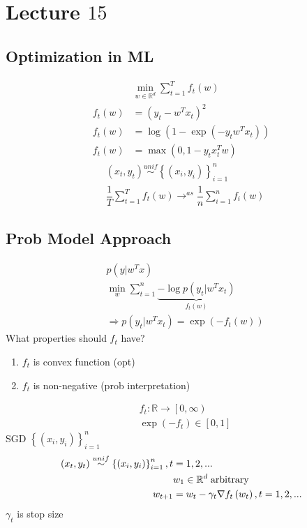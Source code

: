 \documentclass{article}
\begin{document}
\section{Lecture $15$} 


\subsection{Optimization in ML}
\begin{align*}
&\displaystyle\min_{w \in \mathbb{R}^{d}} \displaystyle\sum_{t=1}^{T} f_{t}\left(w \right)
\\ f_{t}\left(w\right) &= \left(y_{t} - w^{T} x_{t}\right)^{2}
\\ f_{t}\left(w\right) &= \log\left(1 - \exp\left(-y_{t} w^{T} x_{t}\right)\right)
\\ f_{t}\left(w\right) &= \displaystyle\max\left(0, 1 - y_{t} x^{T}_{t} w \right)
\end{align*}
\begin{align*}
&\left(x_{t}, y_{t}\right) \stackrel{unif}{\sim} \left\{\left(x_{i}, y_{i}\right)\right\}_{i=1}^{n}
\\ &\dfrac{1}{T} \displaystyle\sum_{t=1}^{T} f_{t}\left(w\right) \to ^{as} \dfrac{1}{n} \displaystyle\sum_{i=1}^{n} f_{i}\left(w\right)
\end{align*}


\subsection{Prob Model Approach}
\begin{align*}
&  p\left(y | w^{T} x \right) 
\\ &  \displaystyle\min_{w} \displaystyle\sum_{t=1}^{n} \underbrace{-\log p\left(y_{t} | w^{T} x_{t}\right)}_{f_{t}\left(w\right)}
\\ &\Rightarrow  p\left(y_{t} | w^{T} x_{t}\right) = \exp\left(-f_{t}\left(w\right)\right)
\end{align*}
What properties should $f_{t}$ have?
\begin{enumerate}
\item $f_{t}$ is convex function (opt)
\item $f_{t}$ is non-negative (prob interpretation)
\end{enumerate}


\begin{align*}
&f_{t} : \mathbb{R} \to  \left[0, \infty\right)
\\ &\exp\left(-f_{t}\right) \in \left[0, 1\right]
\end{align*}
SGD $\left\{\left(x_{i}, y_{i}\right)\right\}_{i=1}^{n}$
\begin{align*}
\left(x_{t}, y_{t}\right) \stackrel{unif}{\sim} \left\{\left(x_{i}, y_{i}\right)\right\}_{i=1}^{n}, t &= 1, 2, ...
\\ &w_{1} \in \mathbb{R}^{d} \text{\;arbitrary\;}
\\ w_{t+1} &= w_{t} - \gamma_{t} \nabla  f_{t}\left(w_{t}\right), t = 1, 2, ...
\end{align*}
$\gamma_{t}$ is stop size
\end{document}
